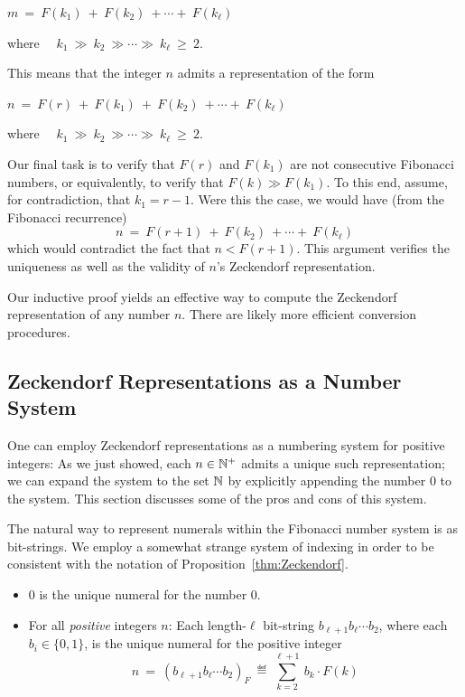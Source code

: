 \hspace*{.25in} $m \ = \ F(k_1) \ + \ F(k_2) \ + \cdots + \ F(k_\ell)$

\smallskip

\noindent
where \ \ $k_1 \ \gg \ k_2 \ \gg \cdots \gg \ k_\ell \ \geq \ 2$.

\noindent
This means that the integer $n$ admits a representation of the form

\hspace*{.25in} $n \ = \ F(r) \ + \ F(k_1) \ + \ F(k_2) \ + \cdots + \ F(k_\ell)$

\smallskip

\noindent
where \ \ $k_1 \ \gg \ k_2 \ \gg \cdots \gg \ k_\ell \ \geq \ 2$.

\smallskip 

Our final task is to verify that $F(r)$ and $F(k_1)$ are not consecutive Fibonacci numbers, or equivalently, to verify that $F(k) \gg F(k_1)$.  To this end, assume, for contradiction, that $k_1=r-1$.  Were this the case, we would have (from the Fibonacci recurrence)
\[ n \ = \ F(r+1) \ + \ F(k_2) \ + \cdots + \ F(k_\ell) \]
which would contradict the fact that $n < F(r+1)$.  This argument verifies the uniqueness as well as the validity of $n$'s Zeckendorf representation.

\medskip

Our inductive proof yields an effective way to compute the Zeckendorf representation of any number $n$.  There are likely more efficient conversion procedures.

\subsection{Zeckendorf Representations as a Number System}
\label{sec:Zeck-rep-number-system}

One can employ Zeckendorf representations as a numbering system for positive integers:  As we just showed, each $n \in \mathbb{N}^+$ admits a unique such representation; we can expand the system to the set $\mathbb{N}$ by explicitly appending the number $0$ to the system.  This section discusses some of the pros and cons of this system.

\smallskip


The natural way to represent numerals within the Fibonacci number system is as bit-strings.  We employ a somewhat strange system of indexing in order to be consistent with the notation of Proposition~\ref{thm:Zeckendorf}.
\begin{itemize}
\item
$0$ is the unique numeral for the number $0$.
\item
For all {\em positive} integers $n$: Each length-$\ell$ bit-string $b_{\ell+1} b_{\ell} \cdots b_2$, where each $b_i \in \{0,1\}$, is the unique numeral for the positive integer
\[ n \ = \ (b_{\ell+1} b_\ell \cdots b_2)_F \ \eqdef \  \sum_{k=2}^{\ell+1} \ b_k \cdot F(k) \]
\end{itemize}

